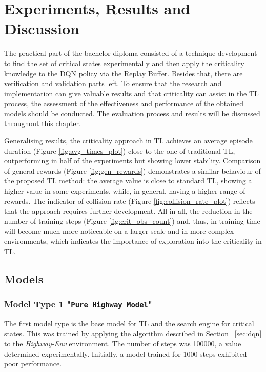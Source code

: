 \section{Experiments, Results and Discussion}\label{chap:chap_4}

The practical part of the bachelor diploma consisted of a technique development to find the set of critical states experimentally and then apply the criticality knowledge to the DQN policy via the Replay Buffer. Besides that, there are verification and validation parts left. To ensure that the research and implementation can give valuable results and that criticality can assist in the TL process, the assessment of the effectiveness and performance of the obtained models should be conducted. The evaluation process and results will be discussed throughout this chapter.

Generalising results, the criticality approach in TL achieves an average episode duration (Figure \ref{fig:avg_times_plot}) close to the one of traditional TL, outperforming in half of the experiments but showing lower stability. Comparison of general rewards (Figure \ref{fig:gen_rewards}) demonstrates a similar behaviour of the proposed TL method: the average value is close to standard TL, showing a higher value in some experiments, while, in general, having a higher range of rewards. The indicator of collision rate (Figure \ref{fig:collision_rate_plot}) reflects that the approach requires further development. All in all, the reduction in the number of training steps (Figure \ref{fig:crit_obs_count}) and, thus, in training time will become much more noticeable on a larger scale and in more complex environments, which indicates the importance of exploration into the criticality in TL.

\subsection{Models}

\subsubsection{Model Type 1 "\texttt{Pure Highway Model}"}\label{sec:model_highway}

The first model type is the base model for TL and the search engine for critical states. This was trained by applying the algorithm described in Section ~\ref{sec:dqn} to the \emph{Highway-Env} environment. The number of steps was 100000, a value determined experimentally. Initially, a model trained for 1000 steps exhibited poor performance.

